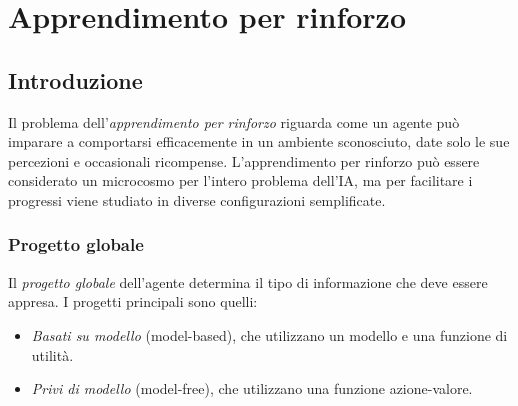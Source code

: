 \documentclass[11pt,oneside]{book}
\begin{document}
\chapter{Apprendimento per rinforzo}

\section{Introduzione}
Il problema dell'\textit{apprendimento per rinforzo} riguarda come un agente può imparare a comportarsi efficacemente in un ambiente sconosciuto, date solo le sue percezioni e occasionali ricompense. L'apprendimento per rinforzo può essere considerato un microcosmo per l'intero problema dell'IA, ma per facilitare i progressi viene studiato in diverse configurazioni semplificate.

\subsection{Progetto globale}
Il \textit{progetto globale} dell'agente determina il tipo di informazione che deve essere appresa. I progetti principali sono quelli:
\begin{itemize}
    \item \textit{Basati su modello} (model-based), che utilizzano un modello e una funzione di utilità.
    \item \textit{Privi di modello} (model-free), che utilizzano una funzione azione-valore.
\end{itemize}
\end{document}

